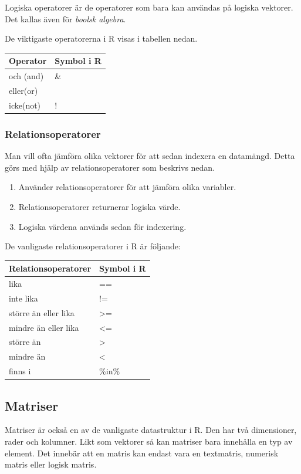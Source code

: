 \documentclass[
]{book}
\providecommand{\tightlist}{%
  \setlength{\itemsep}{0pt}\setlength{\parskip}{0pt}}
\begin{document}
Logiska operatorer är de operatorer som bara kan användas på logiska vektorer. Det kallas även för \emph{boolsk algebra}.

De viktigaste operatorerna i R visas i tabellen nedan.

\begin{longtable}[]{@{}ll@{}}
\toprule
Operator & Symbol i R\tabularnewline
\midrule
\endhead
och (and) & \&\tabularnewline
eller(or) & \textbar{}\tabularnewline
icke(not) & !\tabularnewline
\bottomrule
\end{longtable}

\hypertarget{relationsoperatorer}{%
\subsubsection{Relationsoperatorer}\label{relationsoperatorer}}

Man vill ofta jämföra olika vektorer för att sedan indexera en datamängd. Detta görs med hjälp av relationsoperatorer som beskrivs nedan.

\begin{enumerate}
\def\labelenumi{\arabic{enumi}.}
\tightlist
\item
  Använder relationsoperatorer för att jämföra olika variabler.
\item
  Relationsoperatorer returnerar logiska värde.
\item
  Logiska värdena används sedan för indexering.
\end{enumerate}

De vanligaste relationsoperatorer i R är följande:

\begin{longtable}[]{@{}ll@{}}
\toprule
Relationsoperatorer & Symbol i R\tabularnewline
\midrule
\endhead
lika & ==\tabularnewline
inte lika & !=\tabularnewline
större än eller lika & \textgreater=\tabularnewline
mindre än eller lika & \textless=\tabularnewline
större än & \textgreater{}\tabularnewline
mindre än & \textless{}\tabularnewline
finns i & \%in\%\tabularnewline
\bottomrule
\end{longtable}

\hypertarget{matriser}{%
\subsection{Matriser}\label{matriser}}

Matriser är också en av de vanligaste datastruktur i R. Den har två dimensioner, rader och kolumner. Likt som vektorer så kan matriser bara innehålla en typ av element. Det innebär att en matris kan endast vara en textmatris, numerisk matris eller logisk matris.
\end{document}
